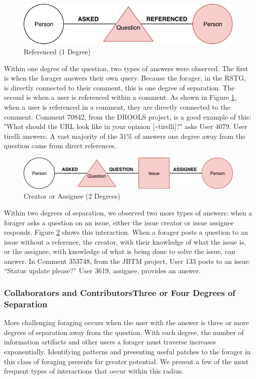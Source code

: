 \documentclass[conference]{IEEEtran}
\begin{document}
\begin{figure}[ht]
	\centering
	\includegraphics[width=0.9\linewidth]{img/1deg.pdf}
	\caption{Referenced (1 Degree)}
	\label{fig:1deg}
\end{figure}

Within one degree of the question, two types of answers were observed. The first is when the forager answers their own query. Because the forager, in the RSTG, is directly connected to their comment, this is one degree of separation. The second is when a user is referenced within a comment. As shown in Figure \ref{fig:1deg}, when a user is referenced in a comment, they are directly connected to the comment. Comment 70842, from the DROOLS project, is a good example of this: "What should the URL look like in your opinion [\textasciitilde tirelli]?" asks User 4079. User tirelli answers. A vast majority of the 31\% of answers one degree away from the question came from direct references.

\begin{figure}[ht]
	\centering
	\includegraphics[width=0.9\linewidth]{img/2deg.pdf}
	\caption{Creator or Assignee (2 Degrees)}
	\label{fig:2deg}
\end{figure}

Within two degrees of separation, we observed two more types of answers: when a forager asks a question on an issue, either the issue creator or issue assignee responds. Figure \ref{fig:2deg} shows this interaction. When a forager posts a question to an issue without a reference, the creator, with their knowledge of what the issue is, or the assignee, with knowledge of what is being done to solve the issue, can answer. In Comment 353748, from the JBTM project, User 133 posts to an issue: ``Status update please?'' User 3619, assignee, provides an answer.

\subsubsection{Collaborators and Contributors\textemdash Three or Four Degrees of Separation}
More challenging foraging occurs when the user with the answer is three or more degrees of separation away from the question. With each degree, the number of information artifacts and other users a forager must traverse increases exponentially. Identifying patterns and presenting useful patches to the forager in this class of foraging presents far greater potential. We present a few of the most frequent types of interactions that occur within this radius. 
\end{document}
